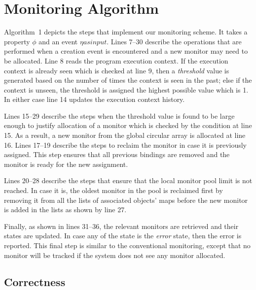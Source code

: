 \section{Monitoring Algorithm}
\label{sec:algo}

Algorithm~1 depicts the steps that implement our monitoring scheme. It takes a
property $\phi$ and an event $\eta as input. $ Lines 7--30 
describe the operations that are performed when a creation event is encountered 
and a new monitor may need to be allocated. Line 8 reads the program execution 
context. If the execution context is already seen which is checked at line 9, 
then a \textit{threshold} value is generated based on the number of times the 
context is seen in the past; else if the context is unseen, the threshold is 
assigned the highest possible value which is 1. In either case line 14 updates 
the execution context history.

Lines 15--29 describe the steps when the threshold value is found to be large 
enough to justify allocation of a monitor which is checked by the condition at 
line 15. As a result, a new monitor from the global circular array is allocated
at line 16. Lines 17--19 describe the steps to reclaim the monitor in case it is previously 
assigned. This step ensures that all previous bindings are removed and the 
monitor is ready for the new assignment.

Lines 20--28 describe the steps that ensure that the local monitor pool limit is 
not reached. In case it is, the oldest monitor in the pool is reclaimed first by 
removing it from all the lists of associated objects' maps before the new monitor 
is added in the lists as shown by line 27.

Finally, as shown in lines 31--36, the relevant monitors are retrieved and their 
states are updated. In case any of the state is the \textit{error} state, then 
the error is reported. This final step is similar to the conventional 
monitoring, except that no monitor will be tracked if the system does not see 
any monitor allocated.

\subsection{Correctness}
\label{subsec:correctness}

